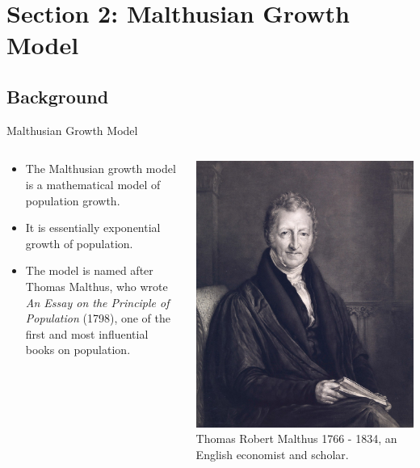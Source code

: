 \section{Section 2: Malthusian Growth Model}
\subsection{Background}


\begin{frame}{Malthusian Growth Model}
\begin{columns}
    \begin{column}{0.6\textwidth}
        \begin{itemize}
    \item The Malthusian growth model is a mathematical model of population growth.
   \item It is essentially exponential growth of population.
   \item The model is named after Thomas  Malthus, who wrote \textit{An Essay on the Principle of Population} (1798), one of the first and most influential books on population.
  \end{itemize}
    \end{column}

    \begin{column}{0.4\textwidth}
    \includegraphics[scale = 0.08]
    {lesson_1/images/malthus_portrait.jpg}
       Thomas Robert Malthus 1766 - 1834, an English economist and scholar.
    \end{column}
\end{columns}
\end{frame}
  
